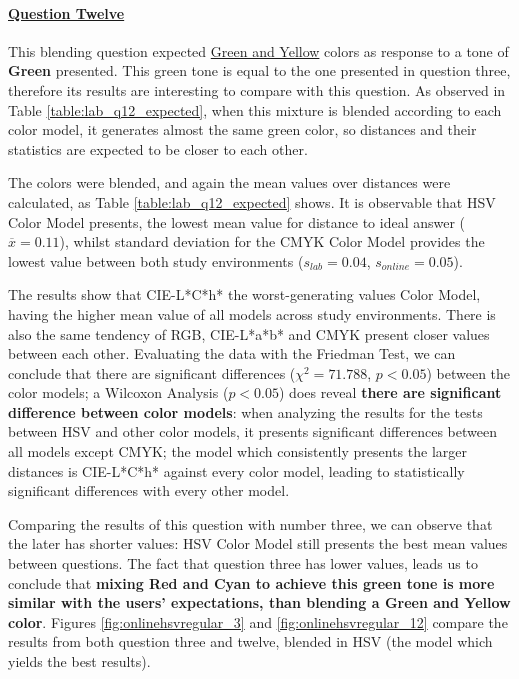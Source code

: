 \paragraph{\ul{Question Twelve}}
%
This blending question expected \ul{Green and Yellow} colors as response to a tone of \textbf{Green} presented. This green tone is equal to the one presented in question three, therefore
its results are interesting to compare with this question. As observed in Table \ref{table:lab_q12_expected}, when this mixture is blended according to each color model, it generates almost
the same green color, so distances and their statistics are expected to be closer to each other. \par
%
The colors were blended, and again the mean values over distances were calculated, as Table \ref{table:lab_q12_expected} shows. It is observable that HSV Color Model presents,
the lowest mean value for distance to ideal answer ($\overline{x} = 0.11$), whilst standard deviation for the CMYK Color Model provides the lowest value between both study environments
($s_{lab} = 0.04$, $s_{online} = 0.05$). \par
%
The results show that CIE-L*C*h* the worst-generating values Color Model, having the higher mean value of all models across study environments. There is also the same tendency of RGB,
CIE-L*a*b* and CMYK present closer values between each other. Evaluating the data with the Friedman Test, we can conclude that there are significant differences ($\chi^2 = 71.788$, $p < 0.05$)
between the color models; a Wilcoxon Analysis ($p < 0.05$) does reveal \textbf{there are significant difference between color models}: when analyzing the results for the tests between HSV and other
color models, it presents significant differences between all models except CMYK; the model which consistently presents the larger distances is CIE-L*C*h* against every color model, leading to
statistically significant differences with every other model. \par
%
Comparing the results of this question with number three, we can observe that the later has shorter values: HSV Color Model still presents the best mean values between questions.
The fact that question three has lower values, leads us to conclude that \textbf{mixing Red and Cyan to achieve this green tone is more similar with the users' expectations, than blending a Green and
Yellow color}. Figures \ref{fig:onlinehsvregular_3} and \ref{fig:onlinehsvregular_12} compare the results from both question three and twelve, blended in HSV (the model which yields the best results).

